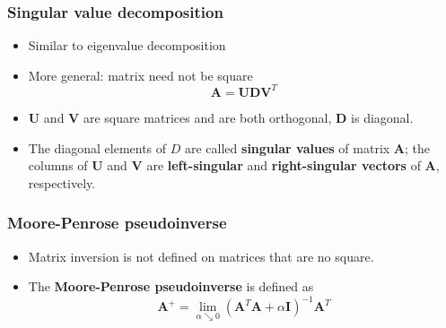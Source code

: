 \documentclass[notes]{beamer}          %
\newcommand{\vect}[1]{\bm{#1}}
\newcommand{\norm}[1]{\left\lVert#1\right\rVert}
\providecommand{\norm}[1]{\lVert#1\rVert}
\newif\iffull
\begin{document}
\iffull
\begin{frame}
\frametitle{Eigendecomposition}
    \begin{itemize}
        \item From the eigendecomposition we learn useful properties of the matrix.
        \item The eigendecomposition of a real symmetric matrix is used in optimization of quadratic expressions of the form $f(\vect{x}) = \vect{x}^T \vect{A} \vect{x}$ under the constraint $\norm{\vect{x}}_2 = 1$.
        \item For instance, if $\vect{x}=\vect{v}^{(i)}$, then $f(\vect{x}) = \lambda_i$, when $\vect{v}^{(i)}$ is an eigenvector of $A$ and $\lambda_i$ is its corresponding eigenvalue.
        \item The maximal (minimal) value of $f$ within the constraint region is equal to the maximal (minimal) eigenvalue.
    \end{itemize}

\end{frame}
\fi


\begin{frame}
\frametitle{Singular value decomposition}
    \begin{itemize}
        \item Similar to eigenvalue decomposition
        \item More general: matrix need not be square
        $$\vect{A} = \vect{U} \vect{D} \vect{V}^T$$
        \item $\vect{U}$ and $\vect{V}$ are square matrices and are both orthogonal, $\vect{D}$ is diagonal.
        \item The diagonal elements of $D$ are called {\bf singular values} of matrix $\vect{A}$; the columns of $\vect{U}$ and $\vect{V}$ are {\bf left-singular} and {\bf right-singular vectors} of $\vect{A}$, respectively.
    \end{itemize}

\end{frame}

\begin{frame}
\frametitle{Moore-Penrose pseudoinverse}
    \begin{itemize}
        \item Matrix inversion is not defined on matrices that are no square.
        \item The {\bf Moore-Penrose pseudoinverse} is defined as
        $$
        \vect{A}^{+} = \lim_{\alpha \searrow 0}(\vect{A}^T\vect{A}+\alpha \vect{I})^{-1}\vect{A}^T
        $$

    \end{itemize}
\end{frame}
\end{document}
